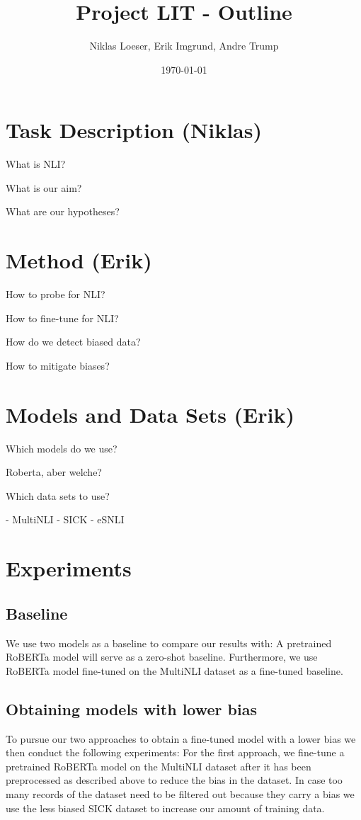 \documentclass[12pt,a4paper]{article}
\title{Project LIT - Outline}
\author{Niklas Loeser, Erik Imgrund, Andre Trump}
\date{\today}
\begin{document}
\begin{acronym}
\end{acronym}

\maketitle

\section{Task Description (Niklas)}
What is NLI?

What is our aim?

What are our hypotheses?

\section{Method (Erik)}
How to probe for NLI?

How to fine-tune for NLI?

How do we detect biased data?

How to mitigate biases?

\section{Models and Data Sets (Erik)}
Which models do we use?

Roberta, aber welche?

Which data sets to use?

- MultiNLI
- SICK
- eSNLI

\section{Experiments}
\subsection{Baseline}
We use two models as a baseline to compare our results with: A pretrained RoBERTa model will serve as a zero-shot baseline. Furthermore, we use RoBERTa model fine-tuned on the MultiNLI dataset as a fine-tuned baseline.

\subsection{Obtaining models with lower bias}
To pursue our two approaches to obtain a fine-tuned model with a lower bias we then conduct the following experiments: For the first approach, we fine-tune a pretrained RoBERTa model on the MultiNLI dataset after it has been preprocessed as described above to reduce the bias in the dataset. In case too many records of the dataset need to be filtered out because they carry a bias we use the less biased SICK dataset to increase our amount of training data. 
\end{document}
